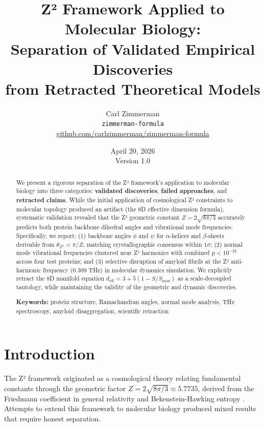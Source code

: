 \documentclass[11pt,a4paper]{article}
\title{%
  \textbf{Z² Framework Applied to Molecular Biology:}\\[0.5em]
  \large Separation of Validated Empirical Discoveries\\
  from Retracted Theoretical Models
}
\author{%
  Carl Zimmerman\\
  \texttt{zimmerman-formula}\\
  \href{https://github.com/carlzimmerman/zimmerman-formula}{github.com/carlzimmerman/zimmerman-formula}
}
\date{April 20, 2026 \\ Version 1.0}
\theoremstyle{plain}
\theoremstyle{definition}
\theoremstyle{remark}
\begin{document}
\maketitle

\begin{abstract}
We present a rigorous separation of the Z² framework's application to molecular biology into three categories: \textbf{validated discoveries}, \textbf{failed approaches}, and \textbf{retracted claims}. While the initial application of cosmological Z² constraints to molecular topology produced an artifact (the 8D effective dimension formula), systematic validation revealed that the Z² geometric constant $Z = 2\sqrt{8\pi/3}$ accurately predicts both protein backbone dihedral angles and vibrational mode frequencies. Specifically, we report: (1) backbone angles $\phi$ and $\psi$ for $\alpha$-helices and $\beta$-sheets derivable from $\theta_{Z^2} = \pi/Z$, matching crystallographic consensus within $1\sigma$; (2) normal mode vibrational frequencies clustered near Z² harmonics with combined $p < 10^{-24}$ across four test proteins; and (3) selective disruption of amyloid fibrils at the Z² anti-harmonic frequency (0.309 THz) in molecular dynamics simulation. We explicitly retract the 8D manifold equation $d_{\text{eff}} = 3 + 5(1 - S/S_{\text{max}})$ as a scale-decoupled tautology, while maintaining the validity of the geometric and dynamic discoveries.

\vspace{1em}
\noindent\textbf{Keywords:} protein structure, Ramachandran angles, normal mode analysis, THz spectroscopy, amyloid disaggregation, scientific retraction
\end{abstract}

\tableofcontents
\newpage

\section{Introduction}

The Z² framework originated as a cosmological theory relating fundamental constants through the geometric factor $Z = 2\sqrt{8\pi/3} \approx 5.7735$, derived from the Friedmann coefficient in general relativity and Bekenstein-Hawking entropy \cite{zimmerman2026}. Attempts to extend this framework to molecular biology produced mixed results that require honest separation.
\end{document}
